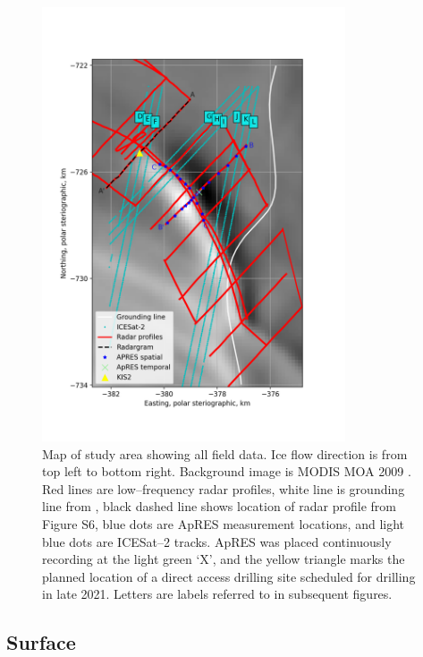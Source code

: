 \begin{figure}[!ht]
\centering
\includegraphics[width=0.8\textwidth]{chapters/2/geophysics_overview.png}
\caption[Map of field data]{Map of study area showing all field data. Ice flow direction is from top left to bottom right. Background image is MODIS MOA 2009 \citep{haran2014modis}. Red lines are low--frequency radar profiles, white line is grounding line from \cite{depoorter2013amii}, black dashed line shows location of radar profile from Figure S6, blue dots are ApRES measurement locations, and light blue dots are ICESat--2 tracks.  ApRES was placed continuously recording at the light green `X', and the yellow triangle marks the planned location of a direct access drilling site scheduled for drilling in late 2021. Letters are labels referred to in subsequent figures.}
\label{fig:geophysics_overview}
\end{figure}


\subsection{Surface} \label{sec:surface}

